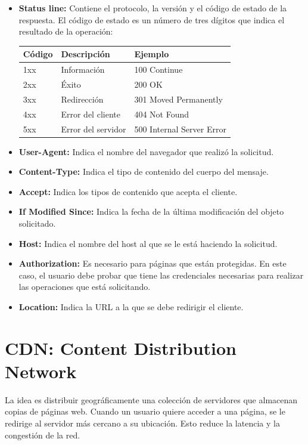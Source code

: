 \begin{itemize}
  \item \textbf{Status line:} Contiene el protocolo, la versión y el código de estado de la respuesta. El código de estado es un número de tres dígitos que indica el resultado de la operación:
  \begin{center}
    \begin{tabularx}{0.8\textwidth}{l|l|l}
      \textbf{Código} & \textbf{Descripción} & \textbf{Ejemplo} \\
      \hline
      1xx & Información & 100 Continue \\
      2xx & Éxito & 200 OK \\
      3xx & Redirección & 301 Moved Permanently \\
      4xx & Error del cliente & 404 Not Found \\
      5xx & Error del servidor & 500 Internal Server Error \\     
    \end{tabularx}
  \end{center}
  \item \textbf{User-Agent:} Indica el nombre del navegador que realizó la solicitud.
  \item \textbf{Content-Type:} Indica el tipo de contenido del cuerpo del mensaje.
  \item \textbf{Accept:} Indica los tipos de contenido que acepta el cliente.
  \item \textbf{If Modified Since:} Indica la fecha de la última modificación del objeto solicitado.
  \item \textbf{Host:} Indica el nombre del host al que se le está haciendo la solicitud.
  \item \textbf{Authorization:} Es necesario para páginas que están protegidas. En este caso, el usuario debe probar que tiene las credenciales necesarias para realizar las operaciones que está solicitando.
  \item \textbf{Location:} Indica la URL a la que se debe redirigir el cliente.
\end{itemize}

\section{CDN: Content Distribution Network}
La idea es distribuir geográficamente una colección de servidores que almacenan copias de páginas web. Cuando un usuario quiere acceder a una página, se le redirige al servidor más cercano a su ubicación. Esto reduce la latencia y la congestión de la red.

